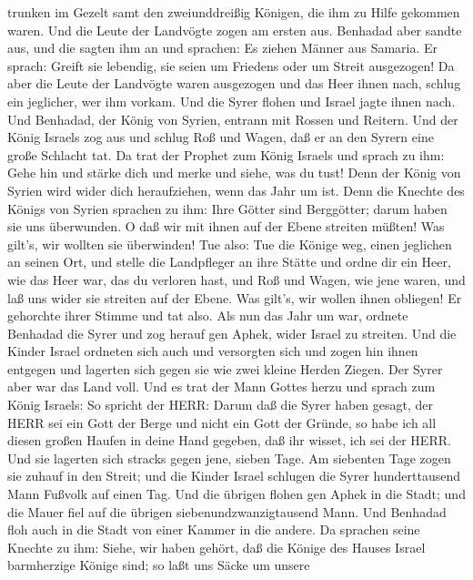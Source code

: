trunken im Gezelt samt den zweiunddreißig Königen, die ihm zu Hilfe
gekommen waren.  Und die Leute der Landvögte zogen am
ersten aus. Benhadad aber sandte aus, und die sagten ihm an und
sprachen: Es ziehen Männer aus Samaria.  Er sprach: Greift
sie lebendig, sie seien um Friedens oder um Streit ausgezogen!
 Da aber die Leute der Landvögte waren ausgezogen und das
Heer ihnen nach,  schlug ein jeglicher, wer ihm vorkam. Und
die Syrer flohen und Israel jagte ihnen nach. Und Benhadad, der König
von Syrien, entrann mit Rossen und Reitern.  Und der König
Israels zog aus und schlug Roß und Wagen, daß er an den Syrern eine
große Schlacht tat.  Da trat der Prophet zum König Israels
und sprach zu ihm: Gehe hin und stärke dich und merke und siehe, was du
tust! Denn der König von Syrien wird wider dich heraufziehen, wenn das
Jahr um ist.  Denn die Knechte des Königs von Syrien
sprachen zu ihm: Ihre Götter sind Berggötter; darum haben sie uns
überwunden. O daß wir mit ihnen auf der Ebene streiten müßten! Was
gilt's, wir wollten sie überwinden!  Tue also: Tue die
Könige weg, einen jeglichen an seinen Ort, und stelle die Landpfleger an
ihre Stätte  und ordne dir ein Heer, wie das Heer war, das
du verloren hast, und Roß und Wagen, wie jene waren, und laß uns wider
sie streiten auf der Ebene. Was gilt's, wir wollen ihnen obliegen! Er
gehorchte ihrer Stimme und tat also.  Als nun das Jahr um
war, ordnete Benhadad die Syrer und zog herauf gen Aphek, wider Israel
zu streiten.  Und die Kinder Israel ordneten sich auch und
versorgten sich und zogen hin ihnen entgegen und lagerten sich gegen sie
wie zwei kleine Herden Ziegen. Der Syrer aber war das Land voll.
 Und es trat der Mann Gottes herzu und sprach zum König
Israels: So spricht der HERR: Darum daß die Syrer haben gesagt, der HERR
sei ein Gott der Berge und nicht ein Gott der Gründe, so habe ich all
diesen großen Haufen in deine Hand gegeben, daß ihr wisset, ich sei der
HERR.  Und sie lagerten sich stracks gegen jene, sieben
Tage. Am siebenten Tage zogen sie zuhauf in den Streit; und die Kinder
Israel schlugen die Syrer hunderttausend Mann Fußvolk auf einen Tag.
 Und die übrigen flohen gen Aphek in die Stadt; und die
Mauer fiel auf die übrigen siebenundzwanzigtausend Mann. Und Benhadad
floh auch in die Stadt von einer Kammer in die andere.  Da
sprachen seine Knechte zu ihm: Siehe, wir haben gehört, daß die Könige
des Hauses Israel barmherzige Könige sind; so laßt uns Säcke um unsere
